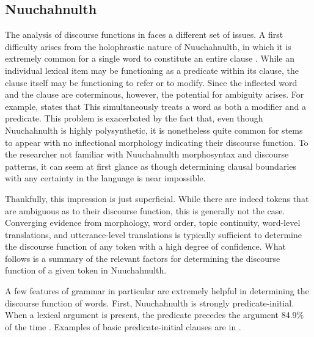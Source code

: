 \subsection{Nuuchahnulth}
\label{sec:3.3.3}

The analysis of discourse functions in  faces a different set of issues. A first difficulty arises from the holophrastic nature of Nuuchahnulth, in which it is extremely common for a single word to constitute an entire clause . While an individual lexical item may be functioning as a predicate within its clause, the clause itself may be functioning to refer or to modify. Since the inflected word and the clause are coterminous, however, the potential for ambiguity arises. For example, \textcite[113]{Nakayama2001} states that  This simultaneously treats a word as both a modifier and a predicate. This problem is exacerbated by the fact that, even though Nuuchahnulth is highly polysynthetic, it is nonetheless quite common for stems to appear with no inflectional morphology indicating their discourse function. To the researcher not familiar with Nuuchahnulth morphosyntax and discourse patterns, it can seem at first glance as though determining clausal boundaries with any certainty in the language is near impossible.

Thankfully, this impression is just superficial. While there are indeed tokens that are ambiguous as to their discourse function, this is generally not the case. Converging evidence from morphology, word order, topic continuity, word-level translations, and utterance-level translations is typically sufficient to determine the discourse function of any token with a high degree of confidence. What follows is a summary of the relevant factors for determining the discourse function of a given token in Nuuchahnulth.

A few features of  grammar in particular are extremely helpful in determining the discourse function of words. First, Nuuchahnulth is strongly predicate-initial. When a lexical argument is present, the predicate precedes the argument 84.9\% of the time \parencite[149]{Nakayama2001}. Examples of basic predicate-initial clauses are in .

